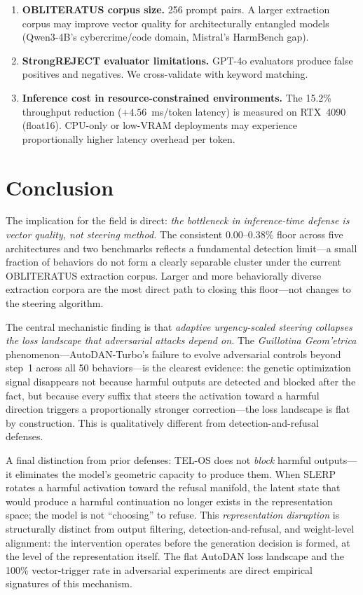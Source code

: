 \documentclass{article}
\begin{document}
\begin{enumerate}
    \item \textbf{OBLITERATUS corpus size.} 256 prompt pairs. A larger extraction
    corpus may improve vector quality for architecturally entangled models
    (Qwen3-4B's cybercrime/code domain, Mistral's HarmBench gap).

    \item \textbf{StrongREJECT evaluator limitations.} GPT-4o evaluators produce
    false positives and negatives. We cross-validate with keyword matching.

    \item \textbf{Inference cost in resource-constrained environments.}
    The 15.2\% throughput reduction ($+4.56$~ms/token latency) is measured on
    RTX~4090 (float16). CPU-only or low-VRAM deployments may experience
    proportionally higher latency overhead per token.
\end{enumerate}

\section{Conclusion}
\label{sec:conclusion}

The implication for the field is direct: \textit{the bottleneck in inference-time
defense is vector quality, not steering method.}
The consistent 0.00--0.38\% floor across five architectures and two benchmarks
reflects a fundamental detection limit---a small fraction of behaviors do not form
a clearly separable cluster under the current \textsc{OBLITERATUS} extraction corpus.
Larger and more behaviorally diverse extraction corpora are the most direct path
to closing this floor---not changes to the steering algorithm.

The central mechanistic finding is that \textit{adaptive urgency-scaled steering
collapses the loss landscape that adversarial attacks depend on.}
The \textit{Guillotina Geom'{e}trica} phenomenon---AutoDAN-Turbo's failure to evolve
adversarial controls beyond step~1 across all 50 behaviors---is the clearest
evidence: the genetic optimization signal disappears not because harmful outputs
are detected and blocked after the fact, but because every suffix that steers the
activation toward a harmful direction triggers a proportionally stronger
correction---the loss landscape is flat by construction.
This is qualitatively different from detection-and-refusal defenses.

A final distinction from prior defenses: TEL-OS does not \textit{block} harmful
outputs---it eliminates the model's geometric capacity to produce them.
When SLERP rotates a harmful activation toward the refusal manifold, the latent
state that would produce a harmful continuation no longer exists in the
representation space; the model is not ``choosing'' to refuse.
This \textit{representation disruption} is structurally distinct from
output filtering, detection-and-refusal, and weight-level alignment: the
intervention operates before the generation decision is formed, at the level
of the representation itself.
The flat AutoDAN loss landscape and the 100\% vector-trigger rate in adversarial
experiments are direct empirical signatures of this mechanism.
\end{document}
